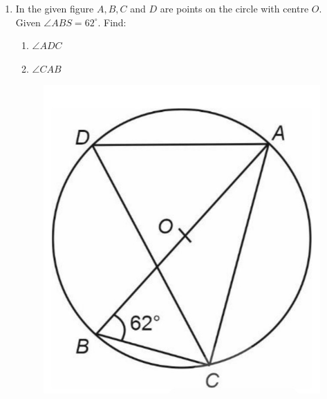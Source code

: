 \begin{enumerate}
\begin{figure}[h]
			\caption{}
			\label{figure}
		\end{figure}
		\newpage
	\item In the given figure $A,B,C$ and $D$ are points on the circle with centre $O$. Given $\angle ABS = 62^{\circ}$. Find:
		\begin{enumerate}
			\item $\angle ADC$
			\item $\angle CAB$
		\end{enumerate}
		\begin{figure}[h]
			\includegraphics[width=\columnwidth]{figs/img5.jpg}
			\caption{}
			\label{figure}
		\end{figure}
\end{enumerate}  
